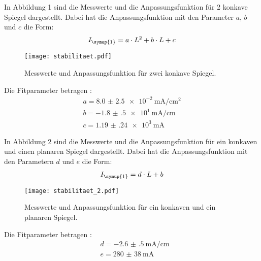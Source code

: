 In Abbildung 1 sind die Messwerte und die Anpassungsfunktion für 2 konkave Spiegel dargestellt.
Dabei hat die Anpassungsfunktion mit den Parameter $a$, $b$ und $c$ die Form:
\begin{align*}
  I_{\symup{1}} = a \cdot L^2 + b \cdot L + c
\end{align*}
\begin{figure}[H]
  \centering
  \texttt{[image: stabilitaet.pdf]}
  \caption{Messwerte und Anpassungsfunktion für zwei konkave Spiegel.}
  \label{fig:plot}
\end{figure}

Die Fitparameter betragen :
\begin{align*}
  a = \SI{ 8.0(25)e-2}{\milli\ampere\per\centi\meter\squared} \\
  b = \SI{-1.8(5)e1}{\milli\ampere\per\centi\meter} \\
  c = \SI{1.19(24)e3}{\milli\ampere}
\end{align*}


In Abbildung 2 sind die Messwerte und die Anpassungsfunktion für ein konkaven und einen
planaren Spiegel dargestellt.
Dabei hat die Anpassungsfunktion mit den Parametern $d$ und $e$ die Form:
\begin{align*}
  I_{\symup{1}} = d \cdot L + b
\end{align*}

\begin{figure}[H]
  \centering
  \texttt{[image: stabilitaet\_2.pdf]}
  \caption{Messwerte und Anpassungsfunktion für ein konkaven und ein planaren Spiegel.}
  \label{fig:plot}
\end{figure}

Die Fitparameter betragen :
\begin{align*}
  &d = \SI{-2.6(5)}{\milli\ampere\per\centi\meter} \\
  &e = \SI{280(38)}{\milli\ampere}
\end{align*}
